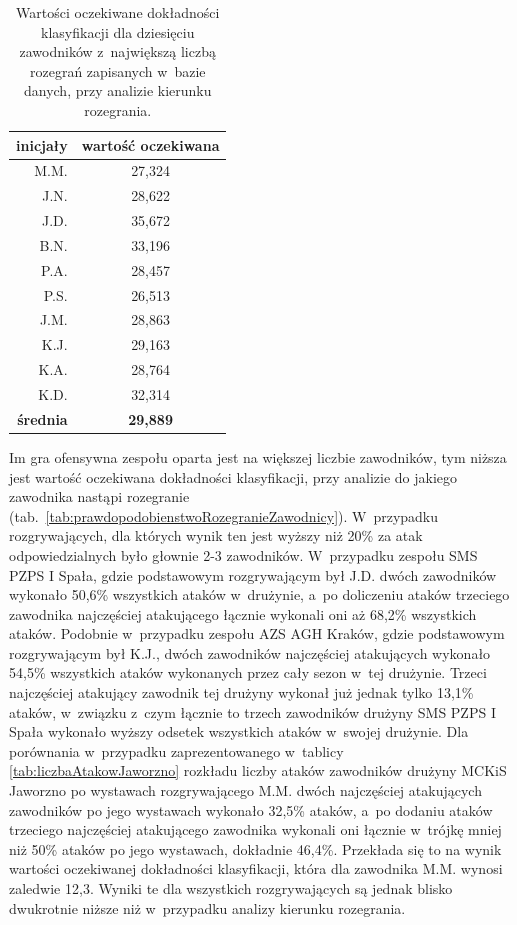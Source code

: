 \documentclass[a4paper,twoside,12pt]{book}
\begin{document}
\begin{table}
\centering
\caption{Wartości oczekiwane dokładności klasyfikacji dla dziesięciu zawodników z~największą liczbą rozegrań zapisanych w~bazie danych, przy analizie kierunku rozegrania.}
\label{tab:prawdopodobienstwoRozegranie}
\begin{tabular}{rc}
\toprule
inicjały & wartość oczekiwana \\ \midrule
M.M. & 27,324 \\ 
J.N. & 28,622 \\ 
J.D. & 35,672 \\ 
B.N. & 33,196 \\ 
P.A. & 28,457 \\ 
P.S. & 26,513 \\ 
J.M. & 28,863 \\ 
K.J. & 29,163 \\ 
K.A. & 28,764 \\ 
K.D. & 32,314\\ 
\midrule
\textbf{średnia} & \textbf{29,889} \\ 
 \bottomrule
\end{tabular}
\end{table}

Im gra ofensywna zespołu oparta jest na większej liczbie zawodników, tym niższa jest wartość oczekiwana dokładności klasyfikacji, przy analizie do jakiego zawodnika nastąpi rozegranie (tab.~\ref{tab:prawdopodobienstwoRozegranieZawodnicy}). W~przypadku rozgrywających, dla których wynik ten jest wyższy niż 20\% za atak odpowiedzialnych było głownie 2-3 zawodników. W~przypadku zespołu SMS PZPS I Spała, gdzie podstawowym rozgrywającym był J.D. dwóch zawodników wykonało 50,6\% wszystkich ataków w~drużynie, a~po doliczeniu ataków trzeciego zawodnika najczęściej atakującego łącznie wykonali oni aż 68,2\% wszystkich ataków. Podobnie w~przypadku zespołu AZS AGH Kraków, gdzie podstawowym rozgrywającym był K.J., dwóch zawodników najczęściej atakujących wykonało 54,5\% wszystkich ataków wykonanych przez cały sezon w~tej drużynie. Trzeci najczęściej atakujący zawodnik tej drużyny wykonał już jednak tylko 13,1\% ataków, w~związku z~czym łącznie to trzech zawodników drużyny SMS PZPS I Spała wykonało wyższy odsetek wszystkich ataków w~swojej drużynie. Dla porównania w~przypadku zaprezentowanego w~tablicy \ref{tab:liczbaAtakowJaworzno} rozkładu liczby ataków zawodników drużyny MCKiS Jaworzno po wystawach rozgrywającego M.M. dwóch najczęściej atakujących zawodników po jego wystawach wykonało 32,5\% ataków, a~po dodaniu ataków trzeciego najczęściej atakującego zawodnika wykonali oni łącznie w~trójkę mniej niż 50\% ataków po jego wystawach, dokładnie 46,4\%. Przekłada się to na wynik wartości oczekiwanej dokładności klasyfikacji, która dla zawodnika M.M. wynosi zaledwie 12,3. Wyniki te dla wszystkich rozgrywających są jednak blisko dwukrotnie niższe niż w~przypadku analizy kierunku rozegrania. 
\end{document}
